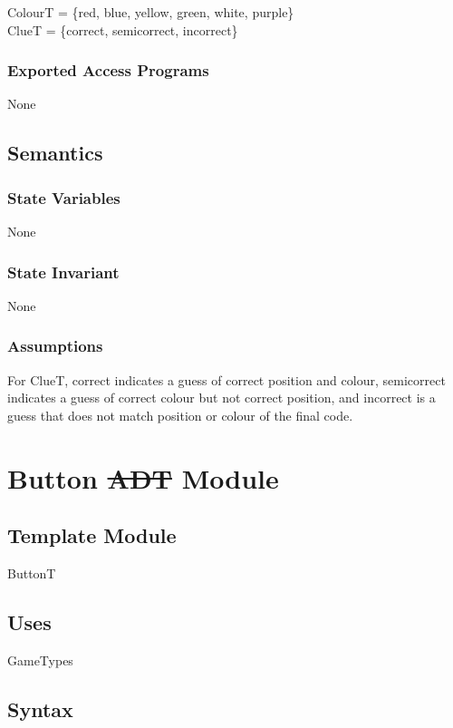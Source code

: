\documentclass[12pt]{article}
\begin{document}
ColourT = \{red, blue, yellow, green, white, purple\}\\
ClueT = \{correct, semicorrect, incorrect\}

\subsubsection* {Exported Access Programs}

None

\subsection* {Semantics}

\subsubsection* {State Variables}
None

\subsubsection* {State Invariant}
None

\subsubsection* {Assumptions}
For ClueT, correct indicates a guess of correct position and colour, semicorrect indicates a guess of correct colour but not correct position, and incorrect is a guess that does not match position or colour of the final code.


\newpage

\section* {Button \sout{ADT} Module}

\subsection*{Template Module}

ButtonT

\subsection* {Uses}
GameTypes

\subsection* {Syntax}
\end{document}

